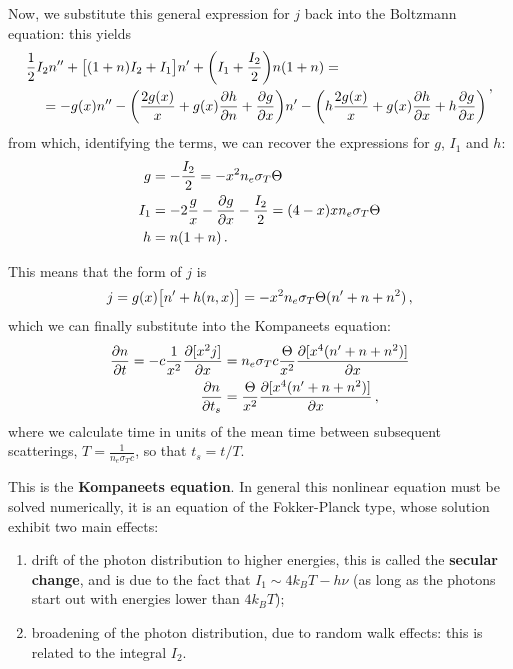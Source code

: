 \documentclass[main.tex]{subfiles}
\begin{document}

Now, we substitute this general expression for \(j\) back into the Boltzmann equation: this yields 
%
\begin{align}
\begin{split}
&\frac{1}{2} I_2 n'' + \qty[(1+ n) I_2 + I_1 ]n' + \qty(I_1 + \frac{I_2}{2}) n (1+n) =
\\
&\phantom{=}\ = - g(x) n'' - \qty( \frac{2 g(x)}{x} + g(x) \pdv{h}{n} + \pdv{g}{x}) n' - \qty(h \frac{2 g(x)}{x} + g(x) \pdv{h}{x} + h \pdv{g}{x})
\end{split}
\,,
\end{align}
%
from which, identifying the terms, we can recover the expressions for \(g\), \(I_1 \) and \(h\): 
%
\begin{align}
g &= - \frac{I_2}{2} = - x^2 n_e \sigma_T \Theta   \\
I_1 &= - 2 \frac{g}{x}  - \pdv{g}{x} - \frac{I_2}{2} = (4-x) x n_e \sigma_T \Theta  \\
h &= n (1 + n)
\,.
\end{align}

This means that the form of \(j\) is 
%
\begin{align}
j= g(x) \qty[n' + h (n, x)] = - x^2 n_e \sigma_T \Theta (n' + n + n^2 )
\,,
\end{align}
%
which we can finally substitute into the Kompaneets equation: 
%
\begin{align}
\pdv{n}{t} = - c \frac{1}{x^2} \pdv{[x^2 j]}{x}
&= n_e \sigma_T c \frac{\Theta }{x^2} \pdv{[x^{4} (n' +n + n^2)]}{x}  \\
\pdv{n}{t_s} &= \frac{\Theta}{x^2} \pdv{[x^{4} (n' + n + n^2)]}{x}
\,,
\end{align}
%
where we calculate time in units of the mean time between subsequent scatterings, \(T = \frac{1}{n_e \sigma _T c} \), so that \(t_s = t / T\).

This is the \textbf{Kompaneets equation}. 
In general this nonlinear equation must be solved numerically, it is an equation of the Fokker-Planck type, whose solution exhibit two main effects: 
\begin{enumerate}
    \item drift of the photon distribution to higher energies, this is called the \textbf{secular change}, and is due to the fact that \(I_1 \sim 4 k_B T - h \nu \) (as long as the photons start out with energies lower than \(4 k_B T\));
    \item broadening of the photon distribution, due to random walk effects: this is related to the integral \(I_2 \). 
\end{enumerate}
\end{document}
